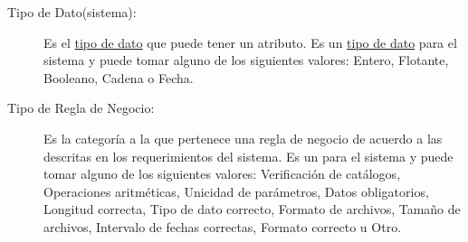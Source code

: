 \begin{description}
	\item[\hypertarget{tTipoDatoP}{Tipo de Dato(sistema):}] Es el \hyperlink{tTipoDato}{tipo de dato} que puede tener un atributo. Es un \hyperlink{tTipoDato}{tipo de dato} para el sistema y puede tomar alguno de los siguientes valores: Entero, Flotante, Booleano, Cadena o Fecha.
	
	\item[\hypertarget{tTipoRN}{Tipo de Regla de Negocio:}] Es la categoría a la que pertenece una regla de negocio de acuerdo a las descritas en los requerimientos del sistema. Es un  para el sistema y puede tomar alguno de los siguientes valores: Verificación de catálogos, Operaciones aritméticas, Unicidad de parámetros, Datos obligatorios, Longitud correcta, Tipo de dato correcto, Formato de archivos, Tamaño de archivos, Intervalo de fechas correctas, Formato correcto u Otro.
	
\end{description}